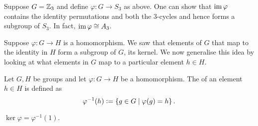 \begin{ex}
    Suppose $G = \mathbb{Z}_3$ and define $\varphi \colon G \to S_3$ as above. One can show that $\operatorname{im}\varphi$ contains the identity permutations and both the $3$-cycles and hence forms a subgroup of $S_3$. In fact, $\operatorname{im}\varphi \cong A_3$.
\end{ex}

\medskip

Suppose $\varphi \colon G \to H$ is a homomorphism. We saw that elements of $G$ that map to the identity in $H$ form a subgroup of $G$, its kernel. We now generalise this idea by looking at what elements in $G$ map to a particular element $h \in H$.
\begin{defn}
    Let $G,H$ be groups and let $\varphi \colon G \to H$ be a homomorphism. The  of an element $h \in H$ is defined as
    \[
        \varphi^{-1}(h) \vcentcolon= \left\{ g \in G \mid \varphi(g) = h \right\}.
    \]
\end{defn}
\begin{rem}
$\ker\varphi = \varphi^{-1}(1)$.
\end{rem}

